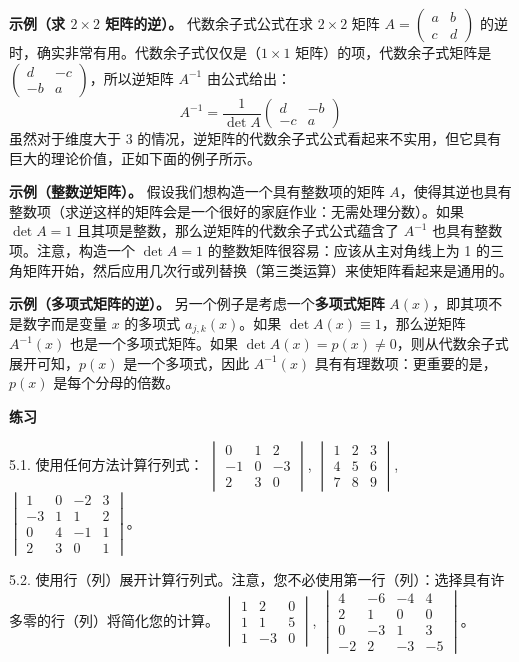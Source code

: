 \textbf{示例（求 $2 \times 2$ 矩阵的逆）。} 代数余子式公式在求 $2 \times 2$ 矩阵 $A = \begin{pmatrix} a & b \\ c & d \end{pmatrix}$ 的逆时，确实非常有用。代数余子式仅仅是（$1 \times 1$ 矩阵）的项，代数余子式矩阵是 $\begin{pmatrix} d & -c \\ -b & a \end{pmatrix}$，所以逆矩阵 $A^{-1}$ 由公式给出：
$$
A^{-1} = \frac{1}{\det A} \begin{pmatrix} d & -b \\ -c & a \end{pmatrix}
$$
虽然对于维度大于 3 的情况，逆矩阵的代数余子式公式看起来不实用，但它具有巨大的理论价值，正如下面的例子所示。

\textbf{示例（整数逆矩阵）。} 假设我们想构造一个具有整数项的矩阵 $A$，使得其逆也具有整数项（求逆这样的矩阵会是一个很好的家庭作业：无需处理分数）。如果 $\det A = 1$ 且其项是整数，那么逆矩阵的代数余子式公式蕴含了 $A^{-1}$ 也具有整数项。注意，构造一个 $\det A = 1$ 的整数矩阵很容易：应该从主对角线上为 1 的三角矩阵开始，然后应用几次行或列替换（第三类运算）来使矩阵看起来是通用的。

\textbf{示例（多项式矩阵的逆）。} 另一个例子是考虑一个\textbf{多项式矩阵} $A(x)$，即其项不是数字而是变量 $x$ 的多项式 $a_{j,k}(x)$。如果 $\det A(x) \equiv 1$，那么逆矩阵 $A^{-1}(x)$ 也是一个多项式矩阵。如果 $\det A(x) = p(x) \neq 0$，则从代数余子式展开可知，$p(x)$ 是一个多项式，因此 $A^{-1}(x)$ 具有有理数项：更重要的是，$p(x)$ 是每个分母的倍数。

\textbf{练习}~

5.1. 使用任何方法计算行列式：
$\begin{vmatrix} 0 & 1 & 2 \\ -1 & 0 & -3 \\ 2 & 3 & 0 \end{vmatrix}$, $\begin{vmatrix} 1 & 2 & 3 \\ 4 & 5 & 6 \\ 7 & 8 & 9 \end{vmatrix}$, $\begin{vmatrix} 1 & 0 & -2 & 3 \\ -3 & 1 & 1 & 2 \\ 0 & 4 & -1 & 1 \\ 2 & 3 & 0 & 1 \end{vmatrix}$。

5.2. 使用行（列）展开计算行列式。注意，您不必使用第一行（列）：选择具有许多零的行（列）将简化您的计算。
$\begin{vmatrix} 1 & 2 & 0 \\ 1 & 1 & 5 \\ 1 & -3 & 0 \end{vmatrix}$, $\begin{vmatrix} 4 & -6 & -4 & 4 \\ 2 & 1 & 0 & 0 \\ 0 & -3 & 1 & 3 \\ -2 & 2 & -3 & -5 \end{vmatrix}$。

